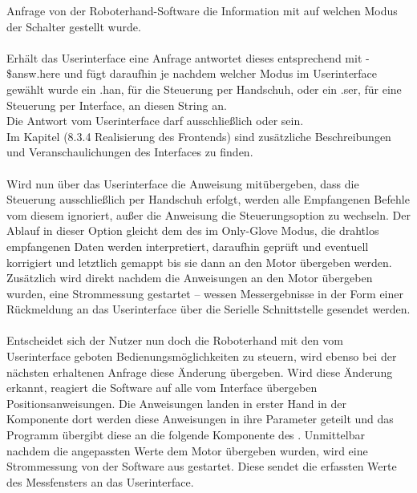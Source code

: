 \documentclass[titlepage,12pt,twoside]{article}
\begin{document}
Anfrage von der Roboterhand-Software die Information mit auf welchen Modus der Schalter gestellt wurde. \\
\\
Erhält das Userinterface eine Anfrage antwortet dieses entsprechend mit - \$answ.here und fügt daraufhin je nachdem welcher Modus im Userinterface gewählt 
wurde ein .han, für die Steuerung per Handschuh, oder ein .ser, für eine Steuerung per Interface, an diesen String an. \\
Die Antwort vom Userinterface darf ausschließlich  oder  sein. \\
Im Kapitel (8.3.4 Realisierung des Frontends) sind zusätzliche Beschreibungen und Veranschaulichungen des Interfaces zu finden. \\
\\
Wird nun über das Userinterface die Anweisung mitübergeben, dass die Steuerung ausschließlich per Handschuh erfolgt, werden alle Empfangenen Befehle vom 
diesem ignoriert, außer die Anweisung die Steuerungsoption zu wechseln. Der Ablauf in dieser Option gleicht dem des im Only-Glove Modus, die drahtlos 
empfangenen Daten werden interpretiert, daraufhin geprüft und eventuell korrigiert und letztlich gemappt bis sie dann an den Motor übergeben werden. 
Zusätzlich wird direkt nachdem die Anweisungen an den Motor übergeben wurden, eine Strommessung gestartet – wessen Messergebnisse in der Form einer 
Rückmeldung an das Userinterface über die Serielle Schnittstelle gesendet werden. \\
\\
Entscheidet sich der Nutzer nun doch die Roboterhand mit den vom Userinterface geboten Bedienungsmöglichkeiten zu steuern, wird ebenso bei der nächsten 
erhaltenen Anfrage diese Änderung übergeben. Wird diese Änderung erkannt, reagiert die Software auf alle vom Interface übergeben Positionsanweisungen. 
Die Anweisungen landen in erster Hand in der Komponente  dort werden diese Anweisungen in ihre Parameter geteilt und das Programm übergibt 
diese an die folgende Komponente des . Unmittelbar nachdem die angepassten Werte dem Motor übergeben wurden, wird eine Strommessung von 
der Software aus gestartet. Diese sendet die erfassten Werte des Messfensters an das Userinterface. \\
\\
\end{document}
